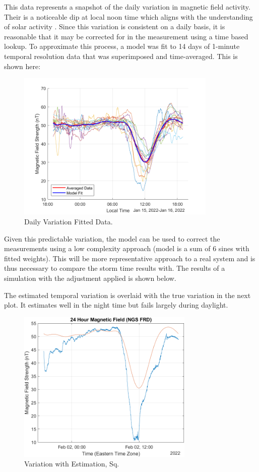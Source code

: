 \documentclass[conf]{new-aiaa}
\begin{document}
This data represents a snapshot of the daily variation in magnetic field activity. Their is a noticeable dip at local noon time which aligns with the understanding of solar activity \cite{Physics_of_the_Earths_Space_Environment}. Since this variation is consistent on a daily basis, it is reasonable that it may be corrected for in the measurement using a time based lookup. To approximate this process, a model was fit to 14 days of 1-minute temporal resolution data that was superimposed and time-averaged. This is shown here:

\begin{figure}[H]
\centering
\includegraphics[width=0.85\textwidth]{figures/daily_model_fit.png}
\caption{Daily Variation Fitted Data.}
\end{figure}

Given this predictable variation, the model can be used to correct the measurements using a low complexity approach (model is a sum of 6 sines with fitted weights). This will be more representative approach to a real system and is thus necessary to compare the storm time results with. The results of a simulation with the adjustment applied is shown below.

The estimated temporal variation is overlaid with the true variation in the next plot. It estimates well in the night time but fails largely during daylight.

\begin{figure}[H]
\centering
\includegraphics[width=0.75\textwidth]{figures/temporal_sq_and_fit.png}
\caption{Variation with Estimation, Sq.}
\end{figure}
\end{document}
